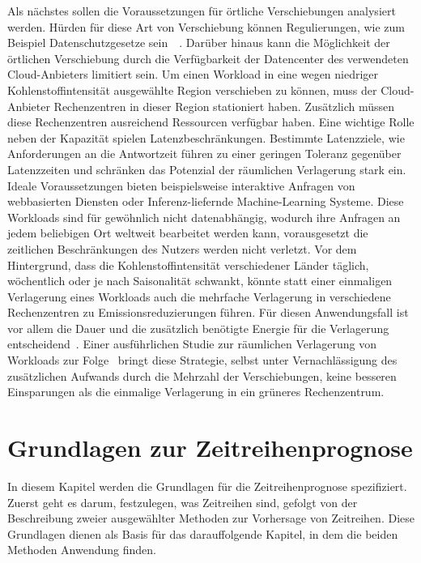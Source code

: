 Als nächstes sollen die Voraussetzungen für örtliche Verschiebungen analysiert werden.
Hürden für diese Art von Verschiebung können Regulierungen, wie zum Beispiel Datenschutzgesetze sein~\cite{Sukprasert.2023}~\cite{Koningstein.18.5.2021}.
Darüber hinaus kann die Möglichkeit der örtlichen Verschiebung durch die Verfügbarkeit der Datencenter des verwendeten Cloud-Anbieters limitiert sein.
Um einen Workload in eine wegen niedriger Kohlenstoffintensität ausgewählte Region verschieben zu können, muss der Cloud-Anbieter Rechenzentren in dieser Region stationiert haben.
Zusätzlich müssen diese Rechenzentren ausreichend Ressourcen verfügbar haben.
Eine wichtige Rolle neben der Kapazität spielen Latenzbeschränkungen.
Bestimmte Latenzziele, wie Anforderungen an die Antwortzeit führen zu einer geringen Toleranz gegenüber Latenzzeiten und schränken das Potenzial der räumlichen Verlagerung stark ein.
Ideale Voraussetzungen bieten beispielsweise interaktive Anfragen von webbasierten Diensten oder Inferenz-liefernde Machine-Learning Systeme.
Diese Workloads sind für gewöhnlich nicht datenabhängig, wodurch ihre Anfragen an jedem beliebigen Ort weltweit bearbeitet werden kann, vorausgesetzt die zeitlichen Beschränkungen des Nutzers werden nicht verletzt.
Vor dem Hintergrund, dass die Kohlenstoffintensität verschiedener Länder täglich, wöchentlich oder je nach Saisonalität schwankt, könnte statt einer einmaligen Verlagerung eines Workloads auch die mehrfache Verlagerung in verschiedene Rechenzentren zu Emissionsreduzierungen führen.
Für diesen Anwendungsfall ist vor allem die Dauer und die zusätzlich benötigte Energie für die Verlagerung entscheidend~\cite{Sukprasert.2023}.
Einer ausführlichen Studie zur räumlichen Verlagerung von Workloads zur Folge~\cite{Sukprasert.2023} bringt diese Strategie, selbst unter Vernachlässigung des zusätzlichen Aufwands durch die Mehrzahl der Verschiebungen, keine besseren Einsparungen als die einmalige Verlagerung in ein grüneres Rechenzentrum.
\chapter{Grundlagen zur Zeitreihenprognose}\label{CAP:tsf_basics}
\noindent In diesem Kapitel werden die Grundlagen für die Zeitreihenprognose spezifiziert.
Zuerst geht es darum, festzulegen, was Zeitreihen sind, gefolgt von der Beschreibung zweier ausgewählter Methoden zur Vorhersage von Zeitreihen.
Diese Grundlagen dienen als Basis für das darauffolgende Kapitel, in dem die beiden Methoden Anwendung finden.
